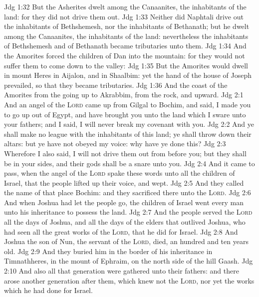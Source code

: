 \vs Jdg 1:32 But the Asherites dwelt among the Canaanites, the inhabitants of the land: for they did not drive them out.
\vs Jdg 1:33 Neither did Naphtali drive out the inhabitants of Bethshemesh, nor the inhabitants of Bethanath; but he dwelt among the Canaanites, the inhabitants of the land: nevertheless the inhabitants of Bethshemesh and of Bethanath became tributaries unto them.
\vs Jdg 1:34 And the Amorites forced the children of Dan into the mountain: for they would not suffer them to come down to the valley:
\vs Jdg 1:35 But the Amorites would dwell in mount Heres in Aijalon, and in Shaalbim: yet the hand of the house of Joseph prevailed, so that they became tributaries.
\vs Jdg 1:36 And the coast of the Amorites  from the going up to Akrabbim, from the rock, and upward.
\vs Jdg 2:1 And an angel of the \textsc{Lord} came up from Gilgal to Bochim, and said, I made you to go up out of Egypt, and have brought you unto the land which I sware unto your fathers; and I said, I will never break my covenant with you.
\vs Jdg 2:2 And ye shall make no league with the inhabitants of this land; ye shall throw down their altars: but ye have not obeyed my voice: why have ye done this?
\vs Jdg 2:3 Wherefore I also said, I will not drive them out from before you; but they shall be  in your sides, and their gods shall be a snare unto you.
\vs Jdg 2:4 And it came to pass, when the angel of the \textsc{Lord} spake these words unto all the children of Israel, that the people lifted up their voice, and wept.
\vs Jdg 2:5 And they called the name of that place Bochim: and they sacrificed there unto the \textsc{Lord}.
\vs Jdg 2:6 And when Joshua had let the people go, the children of Israel went every man unto his inheritance to possess the land.
\vs Jdg 2:7 And the people served the \textsc{Lord} all the days of Joshua, and all the days of the elders that outlived Joshua, who had seen all the great works of the \textsc{Lord}, that he did for Israel.
\vs Jdg 2:8 And Joshua the son of Nun, the servant of the \textsc{Lord}, died,  an hundred and ten years old.
\vs Jdg 2:9 And they buried him in the border of his inheritance in Timnathheres, in the mount of Ephraim, on the north side of the hill Gaash.
\vs Jdg 2:10 And also all that generation were gathered unto their fathers: and there arose another generation after them, which knew not the \textsc{Lord}, nor yet the works which he had done for Israel.
